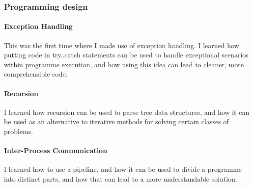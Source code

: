         \subsubsection{Programming design}
            \paragraph{Exception Handling}
            This was the first time where I made use of exception handling. I learned how putting code in try..catch statements can be used to handle exceptional scenarios within programme execution, and how using this idea can lead to cleaner, more comprehensible code.
            \paragraph{Recursion}
            I learned how recursion can be used to parse tree data structures, and how it can be used as an alternative to iterative methods for solving certain classes of problems.
            \paragraph{Inter-Process Communication}
            I learned how to use a pipeline, and how it can be used to divide a programme into distinct parts, and how that can lead to a more understandable solution.

